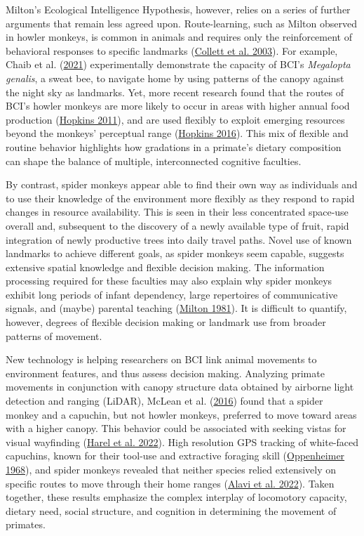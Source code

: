 \documentclass[twoside,12pt,final]{ucthesis-CA2012}
\begin{document}
\begin{ucmainmatter}
Milton's Ecological Intelligence Hypothesis, however, relies on a series of further arguments that remain less agreed upon. Route-learning, such as Milton observed in howler monkeys, is common in animals and requires only the reinforcement of behavioral responses to specific landmarks (\protect\hyperlink{ref-collett2003}{Collett et al. 2003}). For example, Chaib et al. (\protect\hyperlink{ref-chaib2021}{2021}) experimentally demonstrate the capacity of BCI's \emph{Megalopta genalis}, a sweat bee, to navigate home by using patterns of the canopy against the night sky as landmarks. Yet, more recent research found that the routes of BCI's howler monkeys are more likely to occur in areas with higher annual food production (\protect\hyperlink{ref-hopkins2011}{Hopkins 2011}), and are used flexibly to exploit emerging resources beyond the monkeys' perceptual range (\protect\hyperlink{ref-hopkins2016}{Hopkins 2016}). This mix of flexible and routine behavior highlights how gradations in a primate's dietary composition can shape the balance of multiple, interconnected cognitive faculties.

By contrast, spider monkeys appear able to find their own way as individuals and to use their knowledge of the environment more flexibly as they respond to rapid changes in resource availability. This is seen in their less concentrated space-use overall and, subsequent to the discovery of a newly available type of fruit, rapid integration of newly productive trees into daily travel paths. Novel use of known landmarks to achieve different goals, as spider monkeys seem capable, suggests extensive spatial knowledge and flexible decision making. The information processing required for these faculties may also explain why spider monkeys exhibit long periods of infant dependency, large repertoires of communicative signals, and (maybe) parental teaching (\protect\hyperlink{ref-milton1981}{Milton 1981}). It is difficult to quantify, however, degrees of flexible decision making or landmark use from broader patterns of movement.

New technology is helping researchers on BCI link animal movements to environment features, and thus assess decision making. Analyzing primate movements in conjunction with canopy structure data obtained by airborne light detection and ranging (LiDAR), McLean et al. (\protect\hyperlink{ref-mclean2016}{2016}) found that a spider monkey and a capuchin, but not howler monkeys, preferred to move toward areas with a higher canopy. This behavior could be associated with seeking vistas for visual wayfinding (\protect\hyperlink{ref-harel2022}{Harel et al. 2022}). High resolution GPS tracking of white-faced capuchins, known for their tool-use and extractive foraging skill (\protect\hyperlink{ref-oppenheimer1968}{Oppenheimer 1968}), and spider monkeys revealed that neither species relied extensively on specific routes to move through their home ranges (\protect\hyperlink{ref-alavi2022}{Alavi et al. 2022}). Taken together, these results emphasize the complex interplay of locomotory capacity, dietary need, social structure, and cognition in determining the movement of primates.


\end{ucmainmatter}
\end{document}
